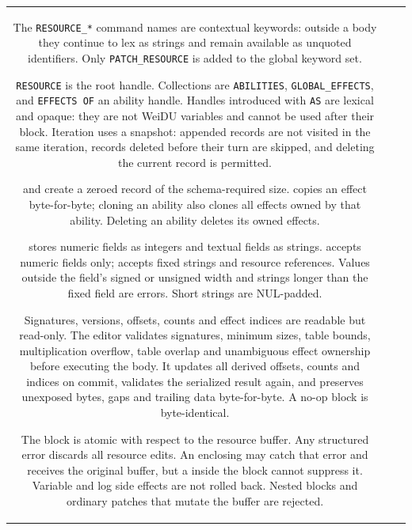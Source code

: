\documentclass{article}
\def\ttref#1{\ahrefloc{#1}{\tt #1}}
\def\t#1{{\tt #1}}
\begin{document}
\begin{tabular}{cp{10in}|p{10in}}
    The \t{RESOURCE_*} command names are contextual keywords: outside a
    \ttref{PATCH_RESOURCE} body they continue to lex as strings and remain
    available as unquoted identifiers. Only \t{PATCH_RESOURCE} is added to
    the global keyword set.

    \t{RESOURCE} is the root handle. Collections are \t{ABILITIES},
    \t{GLOBAL_EFFECTS}, and \t{EFFECTS OF} an ability handle. Handles
    introduced with \t{AS} are lexical and opaque: they are not WeiDU
    variables and cannot be used after their block. Iteration uses a
    snapshot: appended records are not visited in the same iteration,
    records deleted before their turn are skipped, and deleting the
    current record is permitted.

    \ttref{RESOURCE_APPEND} and \ttref{RESOURCE_INSERT} create a zeroed
    record of the schema-required size. \ttref{RESOURCE_CLONE} copies an
    effect byte-for-byte; cloning an ability also clones all effects owned
    by that ability. Deleting an ability deletes its owned effects.

    \ttref{RESOURCE_GET} stores numeric fields as integers and textual
    fields as strings. \ttref{RESOURCE_SET} accepts numeric fields only;
    \ttref{RESOURCE_SPRINT} accepts fixed strings and resource references.
    Values outside the field's signed or unsigned width and strings longer
    than the fixed field are errors. Short strings are NUL-padded.

    Signatures, versions, offsets, counts and effect indices are readable
    but read-only. The editor validates signatures, minimum sizes, table
    bounds, multiplication overflow, table overlap and unambiguous effect
    ownership before executing the body. It updates all derived offsets,
    counts and indices on commit, validates the serialized result again,
    and preserves unexposed bytes, gaps and trailing data byte-for-byte.
    A no-op block is byte-identical.

    The block is atomic with respect to the resource buffer. Any structured
    error discards all resource edits. An enclosing \ttref{PATCH_TRY} may
    catch that error and receives the original buffer, but a
    \ttref{PATCH_TRY} inside the block cannot suppress it. Variable and log
    side effects are not rolled back. Nested \ttref{PATCH_RESOURCE} blocks
    and ordinary patches that mutate the buffer are rejected.


\end{tabular}
\end{document}
